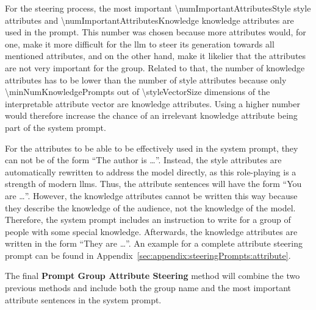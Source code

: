 
For the steering process, the most important \num{\numImportantAttributesStyle} style attributes and \num{\numImportantAttributesKnowledge} knowledge attributes are used in the prompt. This number was chosen because more attributes would, for one, make it more difficult for the \ac{llm} to steer its generation towards all mentioned attributes, and on the other hand, make it likelier that the attributes are not very important for the group. Related to that, the number of knowledge attributes has to be lower than the number of style attributes because only \num{\minNumKnowledgePrompts} out of \num{\styleVectorSize} dimensions of the interpretable attribute vector are knowledge attributes. Using a higher number would therefore increase the chance of an irrelevant knowledge attribute being part of the system prompt.

For the attributes to be able to be effectively used in the system prompt, they can not be of the form \enquote{The author is \ldots}. Instead, the style attributes are automatically rewritten to address the model directly, as this role-playing is a strength of modern \aclp{llm}. %
Thus, the attribute sentences will have the form \enquote{You are \ldots}.
However, the knowledge attributes cannot be written this way because they describe the knowledge of the audience, not the knowledge of the model. Therefore, the system prompt includes an instruction to write for a group of people with some special knowledge. Afterwards, the knowledge attributes are written in the form \enquote{They are \ldots}. An example for a complete attribute steering prompt can be found in Appendix~\ref{sec:appendix:steeringPrompts:attribute}. %

The final \textbf{Prompt Group Attribute Steering} method will combine the two previous methods and include both the group name and the most important attribute sentences in the system prompt.



